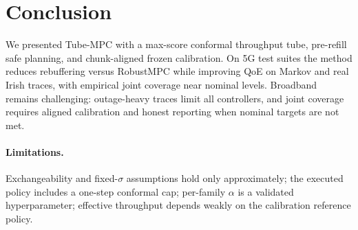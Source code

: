 \section{Conclusion}
\label{sec:conclusion}

We presented Tube-MPC with a max-score conformal throughput tube, pre-refill safe planning, and chunk-aligned frozen calibration.
On \mbox{5G} test suites the method reduces rebuffering versus RobustMPC while improving QoE on Markov and real Irish traces, with empirical joint coverage near nominal levels.
Broadband remains challenging: outage-heavy traces limit all controllers, and joint coverage requires aligned calibration and honest reporting when nominal targets are not met.

\paragraph{Limitations.}
Exchangeability and fixed-\(\sigma\) assumptions hold only approximately; the executed policy includes a one-step conformal cap; per-family \(\alpha\) is a validated hyperparameter; effective throughput depends weakly on the calibration reference policy.

